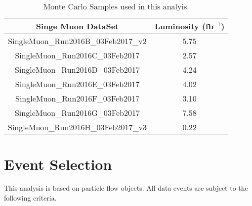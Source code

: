 \documentclass[
10pt, %
a4paper, %
oneside, %
headinclude,footinclude, %
BCOR5mm, %
]{scrartcl}
\begin{document}
\begin{table}[htp]
    \centering
    \label{tab:mcsets}

 \caption{ Monte Carlo Samples used in this analyis.}
\begin{tabular}{|| c c ||}
    \hline
    \textbf{Singe Muon DataSet}  & \textbf{Luminosity (fb$^{-1}$)}\\
 \hline \hline

%
 SingleMuon\_Run2016B\_03Feb2017\_v2 &   5.75  \\
 SingleMuon\_Run2016C\_03Feb2017   &  2.57 \\
 SingleMuon\_Run2016D\_03Feb2017   & 4.24 \\
 SingleMuon\_Run2016E\_03Feb2017   & 4.02 \\
 SingleMuon\_Run2016F\_03Feb2017   & 3.10 \\
 SingleMuon\_Run2016G\_03Feb2017   & 7.58 \\
 SingleMuon\_Run2016H\_03Feb2017\_v3&  0.22 \\



 \hline

 \end{tabular}

\end{table}

\section{Event Selection}

This analysis is based on particle flow objects. All data events are subject to the following criteria.
\end{document}
